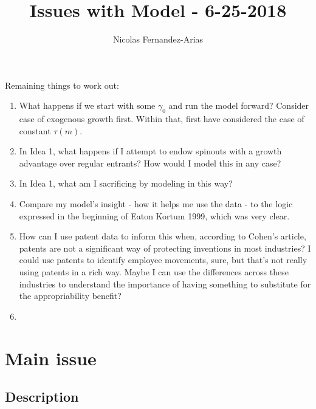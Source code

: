 \documentclass[12pt,english]{article}
\theoremstyle{remark}
\begin{document}
	
\title{Issues with Model - 6-25-2018}
\author{Nicolas Fernandez-Arias}
\maketitle

Remaining things to work out:
\begin{enumerate}
	\item What happens if we start with some $\gamma_0$ and run the model forward? Consider case of exogenous growth first. Within that, first have considered the case of constant $\tau(m)$. 
	\item In Idea 1, what happens if I attempt to endow spinouts with a growth advantage over regular entrants? How would I model this in any case?
	\item In Idea 1, what am I sacrificing by modeling in this way?
	\item Compare my model's insight - how it helps me use the data - to the logic expressed in the beginning of Eaton Kortum 1999, which was very clear.
	\item How can I use patent data to inform this when, according to Cohen's article, patents are not a significant way of protecting inventions in most industries? I could use patents to identify employee movements, sure, but that's not really using patents in a rich way. Maybe I can use the differences across these industries to understand the importance of having something to substitute for the appropriability benefit? 
	\item 
\end{enumerate}

\section{Main issue}

\subsection{Description}
\end{document}
